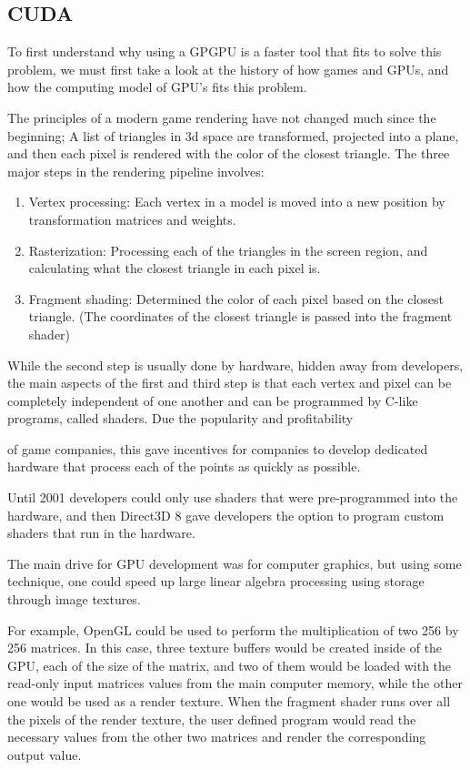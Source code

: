 \documentclass[12pt]{report}
\begin{document}
\subsection{CUDA}

To first understand why using a GPGPU is a faster tool that fits to solve this problem, we must first take a look at the history of how games and GPUs, and how the computing model of GPU’s fits this problem.

The principles of a modern game rendering have not changed much since the beginning; A list of triangles in 3d space are transformed, projected into a plane, and then each pixel is rendered with the color of the closest triangle. The three major steps in the rendering pipeline involves:

\begin{enumerate}
\item Vertex processing: Each vertex in a model is moved into a new position by transformation matrices and weights.
\item Rasterization: Processing each of the triangles in the screen region, and calculating what the closest triangle in each pixel is.
\item Fragment shading: Determined the color of each pixel based on the closest triangle. (The coordinates of the closest triangle is passed into the fragment shader)
\end{enumerate}

While the second step is usually done by hardware, hidden away from developers, the main aspects of the first and third step is that each vertex and pixel can be completely independent of one another and can be programmed by C-like programs, called shaders. Due the popularity and profitability

of game companies, this gave incentives for companies to develop dedicated hardware that process each of the points as quickly as possible.

Until 2001 developers could only use shaders that were pre-programmed into the hardware, and then Direct3D 8 \cite{wiki:direct3d} gave developers the option to program custom shaders that run in the hardware.

The main drive for GPU development was for computer graphics, but using some technique, one could speed up large linear algebra processing using storage through image textures. \cite{Goeddeke:2005:GBM}

For example, OpenGL could be used to perform the multiplication of two 256 by 256 matrices. In this case, three texture buffers would be created inside of the GPU, each of the size of the matrix, and two of them would be loaded with the read-only input matrices values from the main computer memory, while the other one would be used as a render texture. When the fragment shader runs over all the pixels of the render texture, the user defined program would read the necessary values from the other two matrices and render the corresponding output value. 
\end{document}
